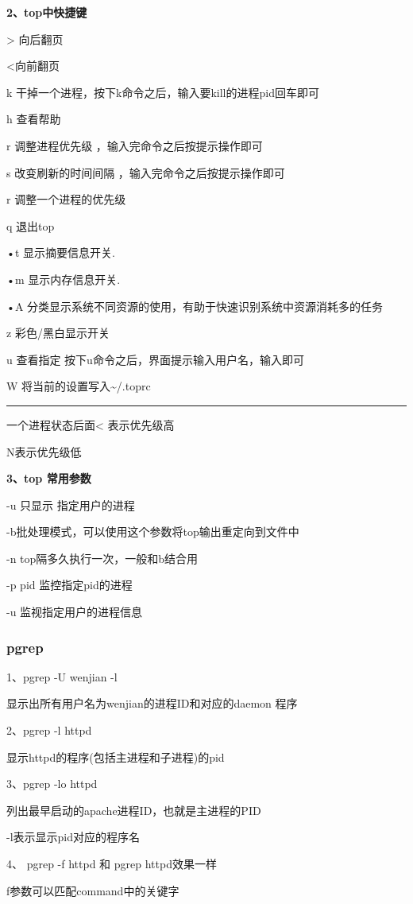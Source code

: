 \documentclass[letterpaper,10pt]{sphinxmanual}
\begin{document}
\textbf{2、top中快捷键}

\textgreater{} 向后翻页

\textless{}向前翻页

k 干掉一个进程，按下k命令之后，输入要kill的进程pid回车即可

h 查看帮助

r 调整进程优先级 ，输入完命令之后按提示操作即可

s 改变刷新的时间间隔 ，输入完命令之后按提示操作即可

r 调整一个进程的优先级

q 退出top

•t 显示摘要信息开关.

•m 显示内存信息开关.

•A 分类显示系统不同资源的使用，有助于快速识别系统中资源消耗多的任务

z 彩色/黑白显示开关

u 查看指定 按下u命令之后，界面提示输入用户名，输入即可

W 将当前的设置写入\textasciitilde{}/.toprc


\bigskip\hrule{}\bigskip


一个进程状态后面\textless{} 表示优先级高

N表示优先级低

\textbf{3、top 常用参数}

-u 只显示 指定用户的进程

-b批处理模式，可以使用这个参数将top输出重定向到文件中

-n top隔多久执行一次，一般和b结合用

-p pid 监控指定pid的进程

-u 监视指定用户的进程信息


\subsubsection{pgrep}
\label{Linux_pro_mana/tools:pgrep}
1、pgrep -U wenjian -l

显示出所有用户名为wenjian的进程ID和对应的daemon 程序

2、pgrep -l httpd

显示httpd的程序(包括主进程和子进程)的pid

3、pgrep -lo httpd

列出最早启动的apache进程ID，也就是主进程的PID

-l表示显示pid对应的程序名

4、 pgrep -f httpd 和 pgrep  httpd效果一样

f参数可以匹配command中的关键字
\end{document}
